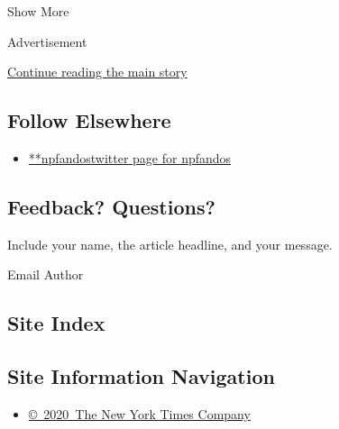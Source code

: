 Show More

Advertisement

\protect\hyperlink{after-mid2}{Continue reading the main story}

\hypertarget{follow-elsewhere}{%
\subsection{Follow Elsewhere}\label{follow-elsewhere}}

\begin{itemize}
\tightlist
\item
  \href{https://twitter.com/npfandos}{**npfandostwitter page for
  npfandos}
\end{itemize}

\hypertarget{feedback-questions}{%
\subsection{Feedback? Questions?}\label{feedback-questions}}

Include your name, the article headline, and your message.

Email Author

\hypertarget{site-index}{%
\subsection{Site Index}\label{site-index}}

\hypertarget{site-information-navigation}{%
\subsection{Site Information
Navigation}\label{site-information-navigation}}

\begin{itemize}
\tightlist
\item
  \href{https://help.nytimes3xbfgragh.onion/hc/en-us/articles/115014792127-Copyright-notice}{©~2020~The
  New York Times Company}
\end{itemize}

